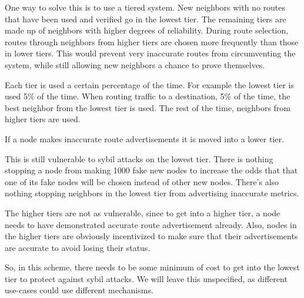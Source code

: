 \documentclass[11pt]{article}
\begin{document}
One way to solve this is to use a tiered system. New neighbors with no routes that have been used and verified go in the lowest tier. The remaining tiers are made up of neighbors with higher degrees of reliability. During route selection, routes through neighbors from higher tiers are chosen more frequently than those in lower tiers. This would prevent very inaccurate routes from circumventing the system, while still allowing new neighbors a chance to prove themselves.

Each tier is used a certain percentage of the time. For example the lowest tier is used 5\% of the time. When routing traffic to a destination, 5\% of the time, the best neighbor from the lowest tier is used. The rest of the time, neighbors from higher tiers are used.

If a node makes inaccurate route advertisements it is moved into a lower tier.

This is still vulnerable to sybil attacks on the lowest tier. There is nothing stopping a node from making 1000 fake new nodes to increase the odds that that one of its fake nodes will be chosen instead of other new nodes. There's also nothing stopping neighbors in the lowest tier from advertising inaccurate metrics.

The higher tiers are not as vulnerable, since to get into a higher tier, a node needs to have demonstrated accurate route advertisement already. Also, nodes in the higher tiers are obviously incentivized to make sure that their advertisements are accurate to avoid losing their status.

So, in this scheme, there needs to be some minimum of cost to get into the lowest tier to protect against sybil attacks. We will leave this unspecified, as different use-cases could use different mechanisms.

\medskip
\end{document}
